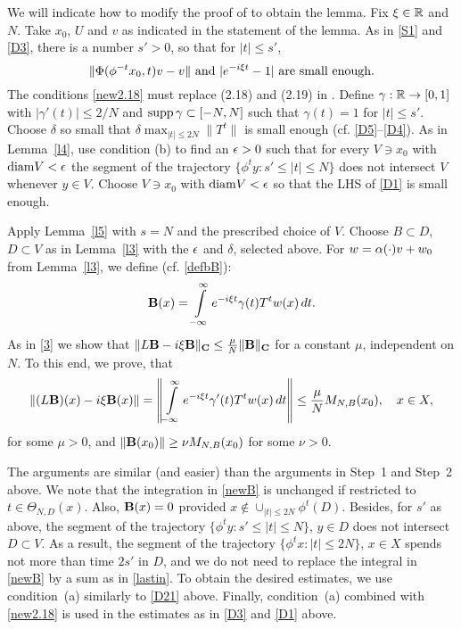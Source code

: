 \begin{pf} We will indicate how to modify 
the proof of 
\cite[Lemma~2.7]{clms} to obtain the lemma.
Fix $\xi\in{\Bbb{R}}$ and $N$. 
Take $x_0$, $U$ and $v$ as indicated in the statement of the lemma.
As in  \eqref{S1} and \eqref{D3}, there is a number
$s'>0$, so that for $|t|\leq s'$, 
\begin{equation}\lb{new2.18}
\|\Phi(\phi^{-t}x_0,t)v-v\| \mbox{ and  }
|e^{-i\xi t}-1| \mbox{  are small enough.}
\end{equation}
The conditions \eqref{new2.18}
must replace (2.18) and (2.19) in
\cite{clms}.
 Define $\gamma:{\Bbb{R}}\to [0,1]$ with $|\gamma'(t)|\leq 2/N$
and $\operatorname{supp}\gamma\subset [-N,N]$
such that $\gamma(t)=1$ for $|t|\leq s'$. 
Choose  $\delta$ so small that
$\delta\max_{|t|\leq 2N}\|T^t\|$ 
is small enough (cf. \eqref{D5}--\eqref{D4}).
As in Lemma~\ref{l4}, use condition (b) to find an $\epsilon>0$ such that
for every $V\ni x_0$ with ${\operatorname{diam}} {V}<\epsilon$
the segment of the trajectory
$\{\phi^ty: s'\leq |t|\leq N\}$
 does not intersect $V$ whenever $y\in V$.
Choose $V\ni x_0$ with ${\operatorname{diam}} {V}<\epsilon$
so that the LHS of \eqref{D1} is small enough.

Apply Lemma~\ref{l5} with $s=N$ and the prescribed choice of
$V$. Choose $B\subset D$, $D\subset V$ as in Lemma~\ref{l3} with the
 $\epsilon$ and $\delta$, selected above.
For $w=\alpha(\cdot)v+w_0$ from Lemma~\ref{l3}, we define
(cf. \eqref{defbB}):
\begin{equation}\lb{newB}
\bB(x)=\int\limits_{-\infty}^{\infty}e^{-i\xi t}
\gamma(t)T^tw(x)\,dt.
\end{equation}
As in \eqref{3} we show that
$\|L{\bold B}-i\xi{\bold B}\|_{{\bold C}}
\leq \frac{\mu}N\|{\bold B}\|_{{\bold C}}$
for a constant $\mu$, independent on $N$. To this end,
we prove, that
\[\|(L{\bold B})(x)-i\xi{\bold B}(x)\|=
\left\|\int\limits_{-\infty}^{\infty}e^{-i\xi t}
\gamma'(t)T^tw(x)\,dt\right\|\leq \frac{\mu}N M_{N,B}(x_0),\quad x\in X,\]
for some $\mu>0$, and
$\|{\bold B}(x_0)\|\geq \nu M_{N,B}(x_0)$ for some $\nu>0$.

The arguments are similar (and easier) 
than the arguments in Step~1 and Step~2 above.
We note that the integration in \eqref{newB}
is unchanged if restricted to $t\in\Theta_{N,D}(x)$. 
Also, ${\bold B}(x)=0$ provided $x\not\in\cup_{|t|\leq 2N}\phi^t(D)$.
Besides, for  $s'$ as above, the segment of the trajectory 
$\{\phi^ty: s'\leq |t|\leq N\}$,
 $y\in D$ does not intersect $D\subset V$. As a result, 
the segment of the trajectory $\{\phi^tx: |t|\leq 2N\}$, $x\in X$
spends not more than time $2s'$ in $D$, and
we do not need to replace the integral in 
\eqref{newB} by a sum as in \eqref{lastin}.
To obtain the desired estimates, we use 
condition~(a)  similarly to \eqref{D21} above. 
Finally, condition~(a) combined with 
\eqref{new2.18} is used in the estimates
as in \eqref{D3} and 
\eqref{D1} above.\end{pf}

